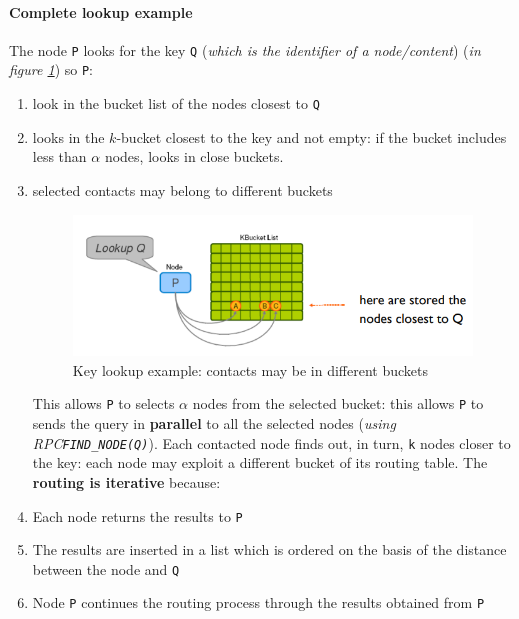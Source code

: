 \documentclass[10pt,a4paper]{report}
\begin{document}
\paragraph{Complete lookup example}\label{sec:complete-lookup-example}
The node \texttt{P} looks for the key \texttt{Q} (\textit{which is the identifier of a node/content}) (\textit{in figure \ref{complete-lookup-1}}) so \texttt{P}:
\begin{enumerate}
	\item 
	look in the bucket list of the nodes closest to \texttt{Q}
	\item 
	looks in the $k$-bucket closest to the key and not empty: if the bucket includes less than $\alpha$ nodes, looks in close buckets.
	\item 
	selected contacts may belong to different buckets
	\begin{figure}[b]
		\centering
		\includegraphics[scale=0.60]{images/Pasted image 20230310114149.png}
		\caption{Key lookup example: contacts may be in different buckets}
		\label{complete-lookup-1}
	
\end{figure}
	
	This allows \texttt{P} to selects $\alpha$ nodes from the selected bucket: this allows \texttt{P} to sends the query in \textbf{parallel} to all the selected nodes (\textit{using RPC\texttt{FIND\_NODE(Q)}}).
	Each contacted node finds out, in turn, \texttt{k} nodes closer to the key: each node may exploit a different bucket of its routing table.
	The \textbf{routing is iterative} because:
	\item 
	Each node returns the results to \texttt{P}
	\item 
	The results are inserted in a list which is ordered on the basis of the distance between the node and \texttt{Q}
	\item 
	Node \texttt{P} continues the routing process through the results obtained from \texttt{P}
\end{enumerate}
\end{document}
